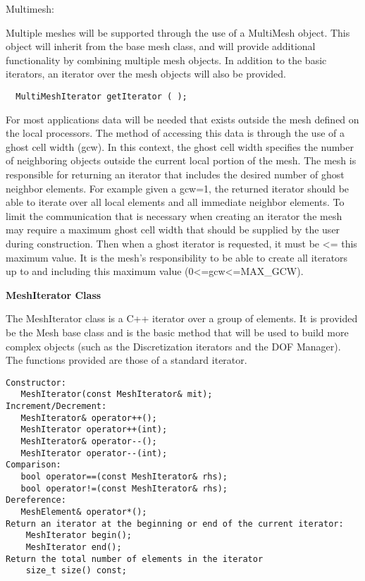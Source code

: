\documentclass[10pt]{article}
\newenvironment{codelisting}
{\begin{list}{}{\setlength{\leftmargin}{2em}}\item\scriptsize\normalsize}
{\end{list}}
\begin{document}
\vspace{3 mm}\linebreak
\noindent Multimesh:
\par\par
Multiple meshes will be supported through the use of a MultiMesh object.  This object will inherit from the base mesh class, and will provide additional functionality by combining multiple mesh objects.  In addition to the basic iterators, an iterator over the mesh objects will also be provided.
\begin{codelisting}
\begin{verbatim}
  MultiMeshIterator getIterator ( );
\end{verbatim}
\end{codelisting}

\vspace{3 mm}\linebreak
For most applications data will be needed that exists outside the mesh defined on the local processors.  The method of accessing this data is through the use of a ghost cell width (gcw).  In this context, the ghost cell width specifies the number of neighboring objects outside the current local portion of the mesh.  The mesh is responsible for returning an iterator that includes the desired number of ghost neighbor elements.  For example given a gcw=1, the returned iterator should be able to iterate over all local elements and all immediate neighbor elements.  To limit the communication that is necessary when creating an iterator the mesh may require a maximum ghost cell width that should be supplied by the user during construction.  Then when a ghost iterator is requested, it must be <= this maximum value.  It is the mesh's responsibility to be able to create all iterators up to and including this maximum value (0<=gcw<=MAX_GCW).  


\vspace{6 mm}\noindent\textbf{MeshIterator Class}

The MeshIterator class is a C++ iterator over a group of elements.  It is provided be the Mesh base class and is the basic method that will be used to build more complex objects (such as the Discretization iterators and the DOF Manager).  The functions provided are those of a standard iterator.
\begin{codelisting}
\begin{verbatim}
Constructor:
   MeshIterator(const MeshIterator& mit);
Increment/Decrement:
   MeshIterator& operator++();
   MeshIterator operator++(int);
   MeshIterator& operator--();
   MeshIterator operator--(int);
Comparison:
   bool operator==(const MeshIterator& rhs);
   bool operator!=(const MeshIterator& rhs);
Dereference:
   MeshElement& operator*();
Return an iterator at the beginning or end of the current iterator:
    MeshIterator begin();
    MeshIterator end();
Return the total number of elements in the iterator
    size_t size() const;
\end{verbatim}
\end{codelisting}
\end{document}
